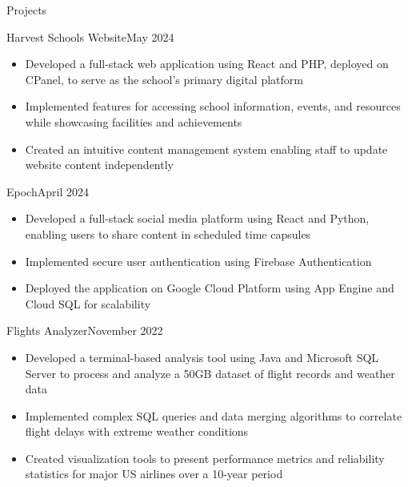 \documentclass{article}
\newlength{\tabin}
\newlength{\secsep}
\newcommand{\lineunder}{\vspace*{-8pt} \\ \hspace*{-6pt} \hrulefill \\ \vspace*{-15pt}}
\newenvironment{tabbedsection}[1]{
    \begin{list}{}{
        \setlength{\itemsep}{0pt}
        \setlength{\labelsep}{0pt}
        \setlength{\labelwidth}{0pt}
        \setlength{\leftmargin}{\tabin}
        \setlength{\rightmargin}{\tabin}
        \setlength{\listparindent}{0pt}
        \setlength{\parsep}{0pt}
        \setlength{\parskip}{0pt}
        \setlength{\partopsep}{0pt}
        \setlength{\topsep}{#1}
    }
        \item[]
        }{
    \end{list}}
\newenvironment{resume_section}[1]{
    \vspace{2\secsep}
    \textsc{\large#1}
    \lineunder
    \begin{tabbedsection}{\secsep}
    }{\end{tabbedsection}}
\newenvironment{resume_subsection}[2]{
    \begin{minipage}[t]{0.75\linewidth}
        \textbf{#1}
    \end{minipage}%
    \begin{minipage}[t]{0.25\linewidth}
        \hfill \footnotesize #2
    \end{minipage}
    \begin{tabbedsection}{0.5\secsep}
    }{\end{tabbedsection}}
\newenvironment{subitems}{
    \renewcommand{\labelitemi}{-}
    \begin{itemize}
        \setlength{\labelsep}{1em}
        }{
    \end{itemize}}
\begin{document}
\begin{resume_section}{Projects}
        \begin{resume_subsection}{Harvest Schools Website}{May 2024}
            \begin{subitems}
                \item Developed a full-stack web application using React and PHP, deployed on CPanel, to serve as the school's primary digital platform
                \item Implemented features for accessing school information, events, and resources while showcasing facilities and achievements
                \item Created an intuitive content management system enabling staff to update website content independently
            \end{subitems}
        \end{resume_subsection}

        \begin{resume_subsection}{Epoch}{April 2024}
            \begin{subitems}
                \item Developed a full-stack social media platform using React and Python, enabling users to share content in scheduled time capsules
                \item Implemented secure user authentication using Firebase Authentication
                \item Deployed the application on Google Cloud Platform using App Engine and Cloud SQL for scalability
            \end{subitems}
        \end{resume_subsection}

        \begin{resume_subsection}{Flights Analyzer}{November 2022}
            \begin{subitems}
                \item Developed a terminal-based analysis tool using Java and Microsoft SQL Server to process and analyze a 50GB dataset of flight records and weather data
                \item Implemented complex SQL queries and data merging algorithms to correlate flight delays with extreme weather conditions
                \item Created visualization tools to present performance metrics and reliability statistics for major US airlines over a 10-year period
            \end{subitems}
        \end{resume_subsection}


\end{resume_section}
\end{document}
